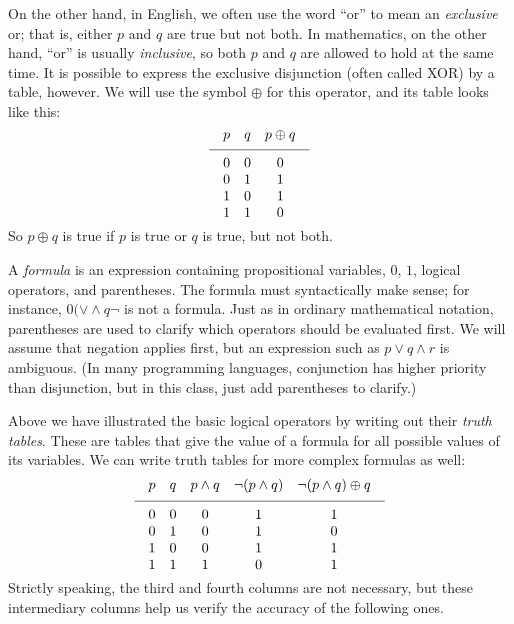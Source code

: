 On the other hand, in English, we often use the word ``or''
to mean an {\it exclusive} or; that is, either $p$ and $q$ are true but not both. In mathematics, on the
other hand, ``or'' is usually {\it inclusive}, so both $p$ and $q$ are allowed to hold at the same time.
It is possible to express the exclusive disjunction (often called {\mc XOR})
by a table, however. We will use the symbol $\oplus$ for this operator, and its table looks like this:
$$
\vbox{
\tabskip=1em plus.2em minus .2em
\halign{
\hfil$#$\hfil & \hfil$#$\hfil & \hfil$#$\hfil \cr
p & q & p\oplus q \cr
\noalign{\medskip}
\noalign{\hrule}
\noalign{\medskip}
0 & 0 & 0 \cr
0 & 1 & 1 \cr
1 & 0 & 1 \cr
1 & 1 & 0 \cr
}}
$$
So $p\oplus q$ is true if $p$ is true or $q$ is true, but not both.

A {\it formula} is an expression containing propositional variables, $0$, $1$, logical operators, and
parentheses. The formula must syntactically make sense; for instance, $0 (\vee \wedge q \neg $ is
not a formula. Just as in ordinary mathematical notation,
parentheses are used to clarify which operators should be evaluated first. We will assume that negation
applies first, but an expression such as $p\vee q \wedge r$ is ambiguous. (In many programming languages,
conjunction has higher priority than disjunction, but in this class, just add parentheses to clarify.)

Above we have illustrated the basic logical operators
by writing out their {\it truth tables}. These are tables that give the value of
a formula for all possible values of its variables. We can write truth tables for more complex formulas as
well:
$$
\vbox{
\tabskip=1em plus.2em minus .2em
\halign{
\hfil$#$\hfil & \hfil$#$\hfil & \hfil$#$\hfil & \hfil$#$\hfil & \hfil$#$\hfil \cr
p & q & p\wedge q & \neg(p \wedge q) & \neg(p\wedge q) \oplus q \cr
\noalign{\medskip}
\noalign{\hrule}
\noalign{\medskip}
0 & 0 & 0 & 1 & 1 \cr
0 & 1 & 0 & 1 & 0 \cr
1 & 0 & 0 & 1 & 1 \cr
1 & 1 & 1 & 0 & 1 \cr
}}
$$
Strictly speaking, the third and fourth columns are not necessary, but these intermediary columns help us
verify the accuracy of the following ones.

